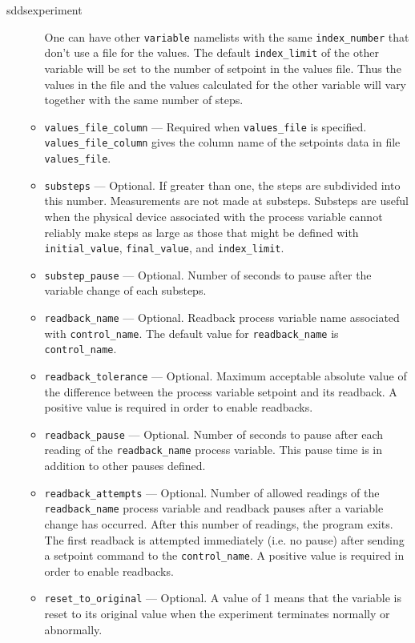 \begin{sddsprog}{sddsexperiment}
\begin{itemize}
\begin{itemize}
                One can have other \verb+variable+ namelists with the same \verb+index_number+
                that don't use a file for the values.
                The default {\verb+index_limit+} of the other variable will be
                set to the number of setpoint in the values file.
                Thus the values in the file and the values calculated for the other variable 
                will vary together with the same number of steps.
        \item {\verb+values_file_column+} --- Required when {\verb+values_file+} is specified.
                {\verb+values_file_column+} gives the column name of the setpoints data 
                in file {\verb+values_file+}. 
        \item {\verb+substeps+} --- Optional. If greater than one, the steps are subdivided into this number.
                Measurements are not made at substeps. Substeps are useful
                when the physical device associated with the process variable cannot reliably make 
                steps as large as those that might be defined with {\verb+initial_value+},
                {\verb+final_value+}, and {\verb+index_limit+}.
        \item {\verb+substep_pause+} --- Optional. Number of seconds to pause after the variable change of each substeps.
        \item {\verb+readback_name+} --- Optional. Readback process variable name 
                associated with {\verb+control_name+}. 
                The default value for {\verb+readback_name+} is {\verb+control_name+}.
        \item {\verb+readback_tolerance+} --- Optional. Maximum acceptable
                absolute value of the difference between the process variable
                setpoint and its readback. A positive value is required in order to enable readbacks.
        \item {\verb+readback_pause+} --- Optional. Number of seconds to pause after 
                each reading of the {\verb+readback_name+} process variable. 
                This pause time is in addition to other pauses defined.
        \item {\verb+readback_attempts+} --- Optional. Number of allowed readings 
                of the {\verb+readback_name+} process variable
                and readback pauses after a variable change has occurred. 
                After this number of readings, the program exits.
                The first readback is attempted immediately (i.e. no pause) after 
                sending a setpoint command to the {\verb+control_name+}.
                A positive value is required in order to enable readbacks.
        \item {\verb+reset_to_original+} --- Optional. A value of 1 means 
                that the variable is reset to its original value when the 
                experiment terminates normally or abnormally. 
\end{itemize}


\end{itemize}
\end{sddsprog}
